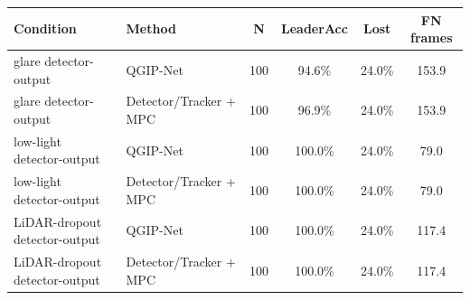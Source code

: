 \begin{tabular}{l l c c c c}
\toprule
\textbf{Condition} & \textbf{Method} & \textbf{N} & \textbf{LeaderAcc} & \textbf{Lost} & \textbf{FN frames} \\
\midrule
glare detector-output & QGIP-Net & 100 & 94.6\% & 24.0\% & 153.9 \\
glare detector-output & Detector/Tracker + MPC & 100 & 96.9\% & 24.0\% & 153.9 \\
low-light detector-output & QGIP-Net & 100 & 100.0\% & 24.0\% & 79.0 \\
low-light detector-output & Detector/Tracker + MPC & 100 & 100.0\% & 24.0\% & 79.0 \\
LiDAR-dropout detector-output & QGIP-Net & 100 & 100.0\% & 24.0\% & 117.4 \\
LiDAR-dropout detector-output & Detector/Tracker + MPC & 100 & 100.0\% & 24.0\% & 117.4 \\
\bottomrule
\end{tabular}
